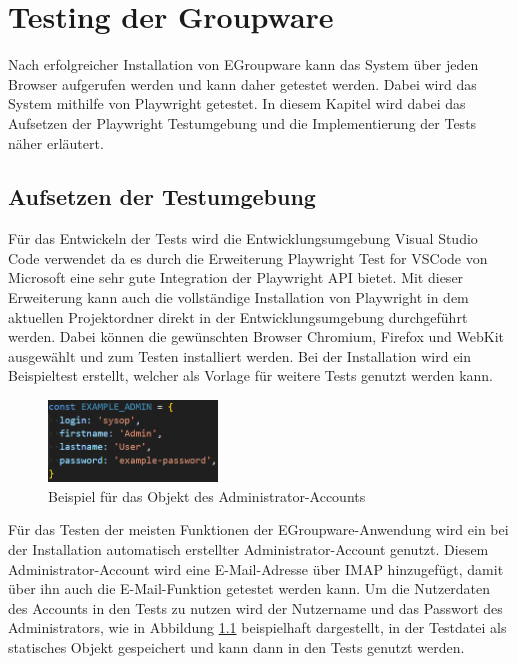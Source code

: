 
\chapter{Testing der Groupware}

Nach erfolgreicher Installation von EGroupware kann das System über jeden Browser aufgerufen werden und kann daher getestet werden.
Dabei wird das System mithilfe von Playwright getestet.
In diesem Kapitel wird dabei das Aufsetzen der Playwright Testumgebung und die Implementierung der Tests näher erläutert.

\section{Aufsetzen der Testumgebung}

Für das Entwickeln der Tests wird die Entwicklungsumgebung Visual Studio Code verwendet da es durch die Erweiterung \glqq Playwright Test for VSCode \grqq von Microsoft eine sehr gute Integration der Playwright API bietet.
Mit dieser Erweiterung kann auch die vollständige Installation von Playwright in dem aktuellen Projektordner direkt in der Entwicklungsumgebung durchgeführt werden.
Dabei können die gewünschten Browser Chromium, Firefox und WebKit ausgewählt und zum Testen installiert werden.
Bei der Installation wird ein Beispieltest erstellt, welcher als Vorlage für weitere Tests genutzt werden kann.

\begin{figure}[H]
    \centering
    \includegraphics[width=0.4\textwidth]{images/ExampleAdmin.png}
    \caption{Beispiel für das Objekt des Administrator-Accounts}
    \label{fig:example-admin}
\end{figure}

Für das Testen der meisten Funktionen der EGroupware-Anwendung wird ein bei der Installation automatisch erstellter Administrator-Account genutzt.
Diesem Administrator-Account wird eine E-Mail-Adresse über IMAP hinzugefügt, damit über ihn auch die E-Mail-Funktion getestet werden kann.
Um die Nutzerdaten des Accounts in den Tests zu nutzen wird der Nutzername und das Passwort des Administrators, wie in Abbildung \ref{fig:example-admin} beispielhaft dargestellt, in der Testdatei als statisches Objekt gespeichert und kann dann in den Tests genutzt werden.

